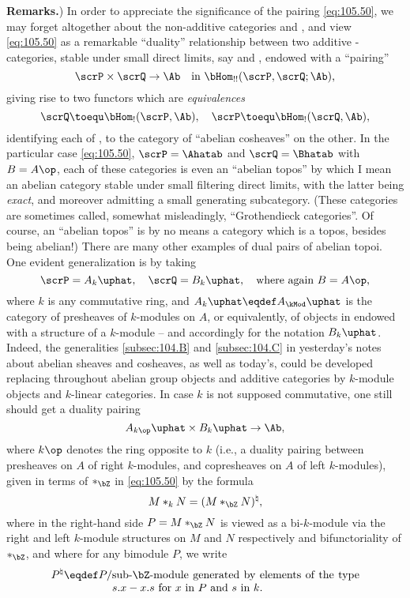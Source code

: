 \noindent\textbf{Remarks.}\enspace{})%
\enspace In order to appreciate the significance of the pairing
\eqref{eq:105.50}, we may forget altogether about the non-additive
categories \Ahat{} and \Bhat, and view \eqref{eq:105.50} as a
remarkable ``duality'' relationship between two additive
\scrU-categories, stable under small direct limits, say \scrP{} and
\scrQ, endowed with a ``pairing''
\[\scrP\times\scrQ\to\Ab\quad\text{in
  $\bHom_{!!}(\scrP,\scrQ;\Ab)$,}\]
giving rise to two functors which are \emph{equivalences}
\[ \scrQ\toequ \bHom_!(\scrP,\Ab),\quad \scrP\toequ
\bHom_!(\scrQ,\Ab),\]
identifying each of \scrP, \scrQ{} to the category of ``abelian
cosheaves'' on the other. In the particular case \eqref{eq:105.50},
$\scrP=\Ahatab$ and $\scrQ=\Bhatab$ with $B=A\op$, each of these
categories is even an ``abelian topos'' by which I mean an abelian
category \scrP{} stable under small filtering direct limits, with the
latter being \emph{exact}, and moreover \scrP{} admitting a small
generating subcategory. (These categories are sometimes called,
somewhat misleadingly, ``Grothendieck categories''. Of course, an
``abelian topos'' is by no means a category which is a topos, besides
being abelian!) There are many other examples of dual pairs of abelian
topoi. One evident generalization is by taking
\[\scrP=A_k\uphat,\quad\scrQ=B_k\uphat,\quad\text{where again
  $B=A\op$,}\]
where $k$ is any commutative ring, and $A_k\uphat\eqdef A_\kMod\uphat$
is the category of presheaves of $k$-modules on $A$, or equivalently,
of objects in \Ahat{} endowed with a structure of a $k$-module -- and
accordingly for the notation $B_k\uphat$. Indeed, the generalities
\ref{subsec:104.B} and \ref{subsec:104.C} in yesterday's notes about
abelian sheaves and cosheaves, as well as today's, could be developed
replacing throughout abelian group objects and additive categories by
$k$-module objects and $k$-linear categories. In case $k$ is not
supposed commutative, one still should get a duality pairing
\[A_{k\op}\uphat\times B_k\uphat\to\Ab,\]
where $k\op$ denotes the ring opposite to $k$ (i.e., a duality pairing
between presheaves on $A$ of right $k$-modules, and copresheaves on
$A$ of left $k$-modules), given in terms of $*_{\bZ}$ in
\eqref{eq:105.50} by the formula
\[M *_{k} N = (M*_{\bZ} N)^\natural,\]
where in the right-hand side $P=M*_{\bZ}N$ is viewed as a
bi-$k$-module via the right and left $k$-module structures on $M$ and
$N$ respectively and bifunctoriality of $*_{\bZ}$, and where for any
bimodule $P$, we write
\[P^\natural \eqdef P /
\parbox[t]{0.65\textwidth}{sub-$\bZ$-module generated by elements of
  the type $s.x-x.s$ for $x$ in $P$ and $s$ in
  $k$.}\]
